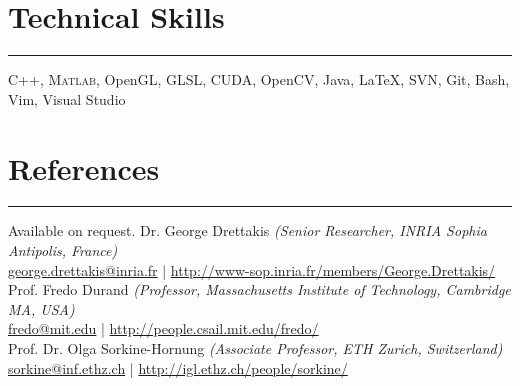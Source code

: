 \documentclass[10pt]{article}
\newcommand{\notes}[1]{\marginnote{\color{Gray}\scriptsize #1}}
\newcommand{\customsection}[1]{\section*{#1}\vspace{-0.2cm}\hrule\vspace{0.1cm}}
\begin{document}

\customsection{Technical Skills}
\noindent
C++, {\scshape Matlab}, OpenGL, GLSL, CUDA, OpenCV, Java, \LaTeX, SVN, Git, Bash, Vim, Visual Studio

\customsection{References}
{%
Available on request.
}{%
Dr. George Drettakis {\itshape (Senior Researcher, INRIA Sophia Antipolis, France)} \\
\href{mailto:george.drettakis@inria.fr}{george.drettakis@inria.fr} |
\href{http://www-sop.inria.fr/members/George.Drettakis/}{http://www-sop.inria.fr/members/George.Drettakis/} \\[0.3cm]
%
Prof. Fredo Durand {\itshape (Professor, Massachusetts Institute of Technology, Cambridge MA, USA)} \\
\href{mailto:fredo@mit.edu}{fredo@mit.edu} |
\href{http://people.csail.mit.edu/fredo/}{http://people.csail.mit.edu/fredo/} \\[0.3cm]
%
%
Prof. Dr. Olga Sorkine-Hornung {\itshape (Associate Professor, ETH Zurich, Switzerland)} \\
\href{mailto:sorkine@inf.ethz.ch}{sorkine@inf.ethz.ch} |
\href{http://igl.ethz.ch/people/sorkine/}{http://igl.ethz.ch/people/sorkine/}
}
\end{document}
